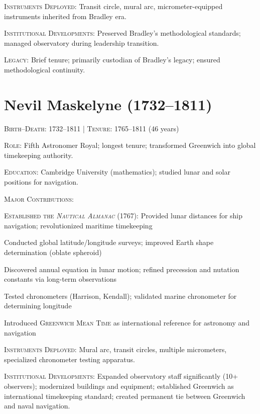 \noindent\textsc{Instruments Deployed}: Transit circle, mural arc, micrometer-equipped instruments inherited from Bradley era.

\noindent\textsc{Institutional Developments}: Preserved Bradley's methodological standards; managed observatory during leadership transition.

\noindent\textsc{Legacy}: Brief tenure; primarily custodian of Bradley's legacy; ensured methodological continuity.

\medskip

\section*{Nevil Maskelyne (1732--1811)}
\textsc{Birth--Death}: 1732--1811 | \textsc{Tenure}: 1765--1811 (46 years)

\noindent\textsc{Role}: Fifth Astronomer Royal; longest tenure; transformed Greenwich into global timekeeping authority.

\noindent\textsc{Education}: Cambridge University (mathematics); studied lunar and solar positions for navigation.

\noindent\textsc{Major Contributions}:
\begin{enumerate*}[label=(\arabic*)]
\item \textsc{Established the \emph{Nautical Almanac}} (1767): Provided lunar distances for ship navigation; revolutionized maritime timekeeping
\item Conducted global latitude/longitude surveys; improved Earth shape determination (oblate spheroid)
\item Discovered annual equation in lunar motion; refined precession and nutation constants via long-term observations
\item Tested chronometers (Harrison, Kendall); validated marine chronometer for determining longitude
\item Introduced \textsc{Greenwich Mean Time} as international reference for astronomy and navigation
\end{enumerate*}

\noindent\textsc{Instruments Deployed}: Mural arc, transit circles, multiple micrometers, specialized chronometer testing apparatus.

\noindent\textsc{Institutional Developments}: Expanded observatory staff significantly (10+ observers); modernized buildings and equipment; established Greenwich as international timekeeping standard; created permanent tie between Greenwich and naval navigation.


